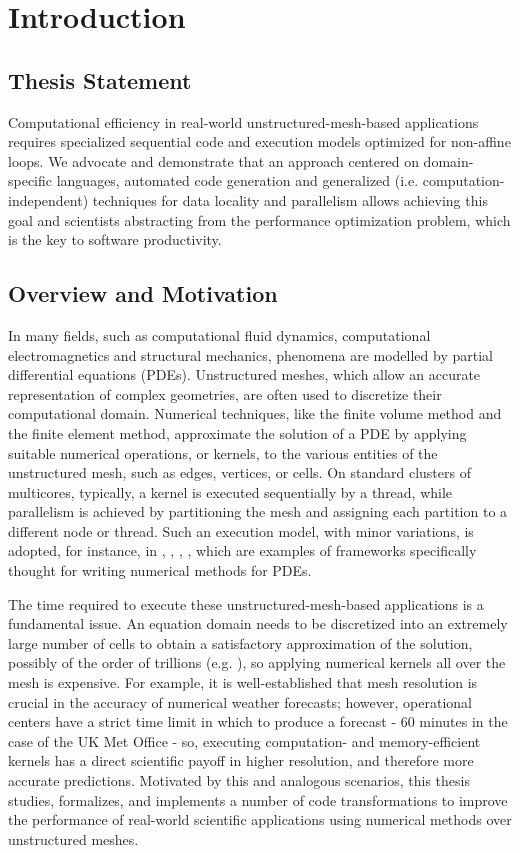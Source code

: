 \chapter{Introduction}

\section{Thesis Statement}
Computational efficiency in real-world unstructured-mesh-based applications requires specialized sequential code and execution models optimized for non-affine loops. We advocate and demonstrate that an approach centered on domain-specific languages, automated code generation and generalized (i.e. computation-independent) techniques for data locality and parallelism allows achieving this goal and scientists abstracting from the performance optimization problem, which is the key to software productivity.

\section{Overview and Motivation}
In many fields, such as computational fluid dynamics, computational
electromagnetics and structural mechanics, phenomena are modelled by
partial differential equations (PDEs). Unstructured meshes, which
allow an accurate representation of complex geometries, are often used 
to discretize their computational domain. Numerical techniques, like the
finite volume method and the finite element method, approximate the solution 
of a PDE by applying suitable numerical operations, or kernels, to the 
various entities of the unstructured mesh, such as edges, vertices, or
cells. On standard clusters of multicores, typically, a kernel is
executed sequentially by a thread, while parallelism is achieved by
partitioning the mesh and assigning each partition to a different node
or thread. Such an execution model, with minor variations, is adopted,
for instance, in \cite{pyop2isc}, \cite{Fenics}, \cite{fluidity_manual_v4}, \cite{lizst}, which
are examples of frameworks specifically thought for writing numerical methods for PDEs.

The time required to execute these unstructured-mesh-based applications is a fundamental issue.
An equation domain needs to be discretized into an extremely
large number of cells to obtain a satisfactory approximation
of the solution, possibly of the order of trillions
(e.g. \cite{Rossinelli2013}), so applying numerical kernels all over the mesh is expensive. 
For example, it is well-established that mesh resolution is crucial in the accuracy of numerical weather
forecasts; however, operational centers have a strict time
limit in which to produce a forecast - 60 minutes in the case of the
UK Met Office - so, executing computation- and memory-efficient 
kernels has a direct scientific payoff in higher resolution, and 
therefore more accurate predictions. Motivated by this and analogous scenarios, 
this thesis studies, formalizes, and implements a number of
code transformations to improve the performance of real-world scientific 
applications using numerical methods over unstructured meshes. 

